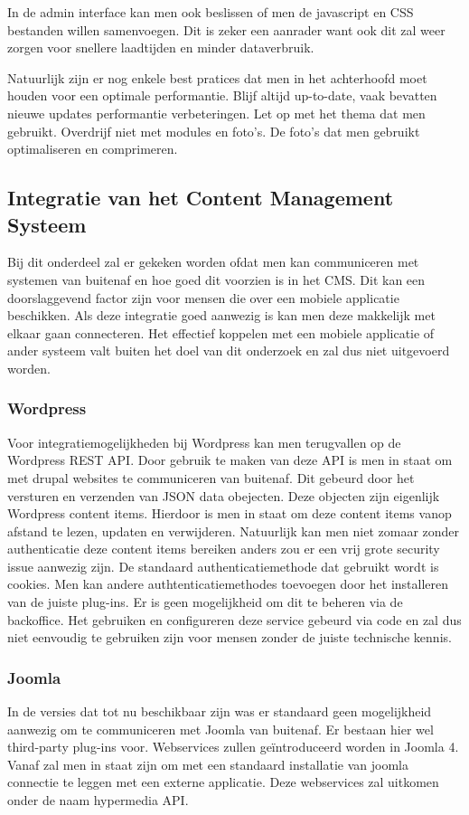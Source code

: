 In de admin interface kan men ook beslissen of men de javascript en CSS bestanden willen samenvoegen. Dit is zeker een aanrader want ook dit zal weer zorgen voor snellere laadtijden en minder dataverbruik.

Natuurlijk zijn er nog enkele best pratices dat men in het achterhoofd moet houden voor een optimale performantie. Blijf altijd up-to-date, vaak bevatten nieuwe updates performantie verbeteringen. Let op met het thema dat men gebruikt. Overdrijf niet met modules en foto's. De foto's dat men gebruikt optimaliseren en comprimeren.

\subsection{Integratie van het Content Management Systeem}
Bij dit onderdeel zal er gekeken worden ofdat men kan communiceren met systemen van buitenaf en hoe goed dit voorzien is in het CMS. Dit kan een doorslaggevend factor zijn voor mensen die over een mobiele applicatie beschikken. Als deze integratie goed aanwezig is kan men deze makkelijk met elkaar gaan connecteren. Het effectief koppelen met een mobiele applicatie of ander systeem valt buiten het doel van dit onderzoek en zal dus niet uitgevoerd worden.
\subsubsection{Wordpress}
Voor integratiemogelijkheden bij Wordpress kan men terugvallen op de Wordpress REST API. Door gebruik te maken van deze API is men in staat om met drupal websites te communiceren van buitenaf. Dit gebeurd door het versturen en verzenden van JSON data obejecten. Deze objecten zijn eigenlijk Wordpress content items. Hierdoor is men in staat om deze content items vanop afstand te lezen, updaten en verwijderen. Natuurlijk kan men niet zomaar zonder authenticatie deze content items bereiken anders zou er een vrij grote security issue aanwezig zijn. De standaard authenticatiemethode dat gebruikt wordt is cookies. Men kan andere authtenticatiemethodes toevoegen door het installeren van de juiste plug-ins. Er is geen mogelijkheid om dit te beheren via de backoffice. Het gebruiken en configureren deze service gebeurd via code en zal dus niet eenvoudig te gebruiken zijn voor mensen zonder de juiste technische kennis.
\subsubsection{Joomla}
In de versies dat tot nu beschikbaar zijn was er standaard geen mogelijkheid aanwezig om te communiceren met Joomla van buitenaf. Er bestaan hier wel third-party plug-ins voor. Webservices zullen geïntroduceerd worden in Joomla 4. Vanaf zal men in staat zijn om met een standaard installatie van joomla connectie te leggen met een externe applicatie. Deze webservices zal uitkomen onder de naam hypermedia API.
